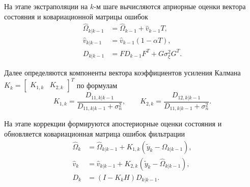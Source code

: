 На этапе экстраполяции на $k$-м шаге вычисляются априорные оценки вектора состояния и ковариационной матрицы ошибок
\begin{align}
\hat{\Omega}_{k|k-1} &= \hat{\Omega}_{k-1} + \hat{v}_{k-1} T, \\
\hat{v}_{k|k-1} &= \hat{v}_{k-1}(1 - \alpha T), \\
D_{k|k-1} &= F D_{k-1} F^T + G \sigma_\xi^2 G^T.
\end{align}

Далее определяются компоненты вектора коэффициентов усиления Калмана $K_k = \begin{bmatrix} K_{1,k} & K_{2,k} \end{bmatrix}^T$ по формулам
\begin{equation}
K_{1,k} = \frac{D_{11, k|k-1}}{D_{11, k|k-1} + \sigma_n^2}, \qquad K_{2,k} = \frac{D_{12, k|k-1}}{D_{11, k|k-1} + \sigma_n^2}.
\end{equation}

На этапе коррекции формируются апостериорные оценки состояния и обновляется ковариационная матрица ошибок фильтрации
\begin{align}
\hat{\Omega}_k &= \hat{\Omega}_{k|k-1} + K_{1,k} (\tilde{y}_k - \hat{\Omega}_{k|k-1}), \\
\hat{v}_k &= \hat{v}_{k|k-1} + K_{2,k} (\tilde{y}_k - \hat{\Omega}_{k|k-1}), \\
D_k &= (I - K_k H) D_{k|k-1}.
\end{align}

